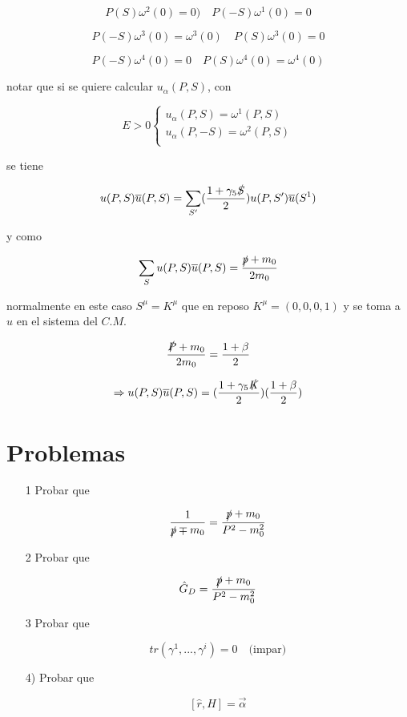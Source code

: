 \documentclass{report}
\begin{document}
\[P(S)\omega^{2}(0)= 0) \quad P(-S) \omega^1 (0) = 0\]

\[P(-S)\omega^{3}(0)= \omega^3 (0) \quad P(S) \omega^3 (0) = 0\]

\[P(-S)\omega^{4}(0)= 0 \quad P(S) \omega^4 (0) = \omega^4 (0)\]

notar que si se quiere calcular $u_{\alpha}(P,S)$, con

\[ E>0
  \begin{cases}
    u_{\alpha}(P,S) = \omega^1 (P,S)\\
    u_{\alpha}(P,-S) = \omega^2 (P,S)\\
  \end{cases}
\]

se tiene

\[u(P,S) \overline{u}(P,S) = \sum_{S^{\prime}} (\frac{1+ \gamma_5 \slashed{S}}{2}) u(P,S^{\prime}) \overline{u}(S^{1}) \]

y como 

\[\sum_{S} u(P,S) \overline{u} (P,S) = \frac{\slashed{p} + m_0}{2m_0 }\]

normalmente en este caso $S^{\mu} = K^{\mu}$ que en reposo $K^{\mu} = (0,0,0,1)$ y se toma a $u$ en el sistema del $C.M.$

\[\frac{\slashed{P}+m_0}{2m_0} = \frac{1+ \beta}{2}\]

\[\Rightarrow u(P,S) \overline{u}(P,S) = (\frac{1+\gamma_5 \slashed{K}}{2}) (\frac{1+\beta}{2})\]

\section{Problemas}

\begin{itemize}
\item[1] Probar que 

\[\frac{1}{\slashed{p} \mp m_0} = \frac{\slashed{p}+m_0}{P^2 - m_{0}^{2}}\]

\item[2] Probar que

\[\hat{G}_{D} = \frac{\slashed{p}+m_0}{P^2 -m_{0}^{2}}\]

\item[3] Probar que 

\[tr (\gamma^1,...,\gamma^i) = 0 \quad \text{(impar)}\]

\item[4)] Probar que

\[[\hat{r},H] = \vec{\alpha}\]

\end{itemize}
\end{document}
